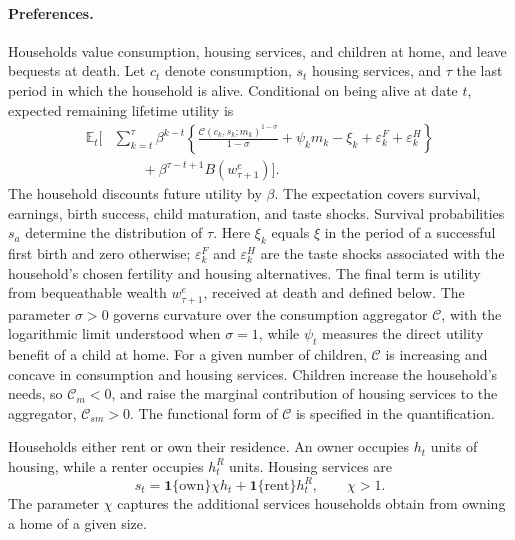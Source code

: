 \paragraph{Preferences.}
Households value consumption, housing services, and children at home, and
leave bequests at death. Let $c_t$ denote consumption, $s_t$ housing services,
and $\tau$ the last period in which the household is alive. Conditional on
being alive at date $t$, expected remaining lifetime utility is
\begin{equation}
 \begin{aligned}
 \mathbb E_t\Bigg[
 &\sum_{k=t}^{\tau}\beta^{k-t}
 \left\{
 \frac{\mathcal C(c_k,s_k;m_k)^{1-\sigma}}{1-\sigma}
 +\psi_k m_k-\xi_k+\varepsilon_k^F+\varepsilon_k^H
 \right\}\\
 &\qquad +\beta^{\tau-t+1}B(w^e_{\tau+1})
 \Bigg].
 \end{aligned}
 \label{eq:env-flow-utility}
\end{equation}
The household discounts future utility by $\beta$. The expectation covers
survival, earnings, birth success, child maturation, and taste shocks.
Survival probabilities $s_a$ determine the distribution of $\tau$.
Here $\xi_k$ equals $\xi$ in the period of a successful first birth and zero
otherwise; $\varepsilon_k^F$ and $\varepsilon_k^H$ are the taste shocks
associated with the household's chosen fertility and housing alternatives.
The final term is utility from bequeathable wealth $w^e_{\tau+1}$, received
at death and defined below.
The parameter $\sigma>0$ governs curvature over the consumption aggregator
$\mathcal C$, with the logarithmic limit understood when $\sigma=1$, while
$\psi_t$ measures the direct utility benefit of a child at home.
For a given number of children, $\mathcal C$ is increasing and concave in
consumption and housing services. Children increase the household's needs,
so $\mathcal C_m<0$, and raise the marginal contribution of housing services
to the aggregator, $\mathcal C_{sm}>0$. The functional form of
$\mathcal C$ is specified in the quantification.

Households either rent or own their residence. An owner occupies $h_t$ units
of housing, while a renter occupies $h_t^R$ units. Housing services are
\begin{equation}
 s_t=\mathbf{1}\{\text{own}\}\chi h_t
     +\mathbf{1}\{\text{rent}\}h_t^R,
 \qquad \chi>1.
 \label{eq:env-housing-services}
\end{equation}
The parameter $\chi$ captures the additional services households obtain from
owning a home of a given size.

